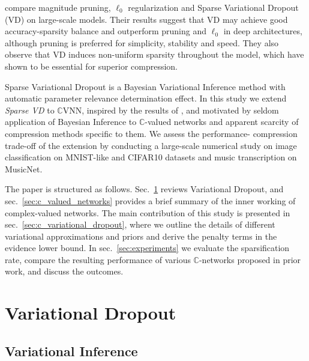\documentclass[a4paper,10pt,twocolumn]{article}
\newcommand{\cplx}{\mathbb{C}}
\begin{document}
\citet{gale_state_2019} compare magnitude pruning, $\ell_0$ regularization and Sparse
Variational Dropout (VD) on large-scale models. Their results suggest that VD may achieve
good accuracy-sparsity balance and outperform pruning and $\ell_0$ in deep architectures,
although pruning is preferred for simplicity, stability and speed. They also observe that
VD induces non-uniform sparsity throughout the model, which \citet{he_amc:_2018} have shown
to be essential for superior compression.

Sparse Variational Dropout is a Bayesian Variational Inference method with automatic
parameter relevance determination effect. In this study we extend \emph{Sparse VD} to
$\cplx$VNN, inspired by the results of \citet{gale_state_2019}, and motivated by seldom
application of Bayesian Inference to $\cplx$-valued networks \citep{popa_complex-valued_2017}
and apparent scarcity of compression methods specific to them. We assess the performance-%
compression trade-off of the extension by conducting a large-scale numerical study on
image classification on MNIST-like and CIFAR10 datasets and music transcription on MusicNet.

The paper is structured as follows. Sec.~\ref{sec:variational_dropout} reviews Variational
Dropout, and sec.~\ref{sec:c_valued_networks} provides a brief summary of the inner
working of complex-valued networks. The main contribution of this study is presented in
sec.~\ref{sec:c_variational_dropout}, where we outline the details of different variational
approximations and priors and derive the penalty terms in the evidence lower bound.
In sec.~\ref{sec:experiments} we evaluate the sparsification rate, compare the resulting
performance of various $\cplx$-networks proposed in prior work, and discuss the outcomes.



\section{Variational Dropout} %
\label{sec:variational_dropout}

\subsection{Variational Inference} %
\label{sub:variational_inference}
\end{document}
